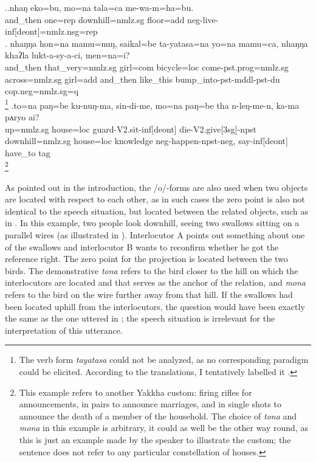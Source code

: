 \ex.\ag.\label{mewamhabu}nhaŋ eko=bu,    mo=na tala=ca         me-wa-m=ha=bu.\\
and\_then one{\sc =rep} downhill{\sc =nmlz.sg} floor{\sc =add} {\sc neg-}live{\sc -inf[deont]=nmlz.nsg=rep} \\
 
\bg. nhaŋŋa hon=na mamu=nuŋ, saikal=be ta-yatasa=na yo=na mamu=ca, nhaŋŋa khaʔla lukt-a-sy-a-ci,  men=na=i?\\
	and\_then that\_very{\sc =nmlz.sg} girl{\sc =com} bicycle{\sc =loc} come{\sc [3sg]-pst.prog=nmlz.sg} across{\sc =nmlz.sg} girl{\sc =add} and\_then like\_this bump\_into{\sc -pst-mddl-pst-du} {\sc cop.neg=nmlz.sg=q}\\
\footnote{The verb form \emph{tayatasa} could not be analyzed, as no corresponding paradigm could be elicited. According to the  translations, I tentatively labelled it .} 
\bg.to=na  paŋ=be     ku-nuŋ-ma, sin-di-me,  mo=na  paŋ=be     tha  n-leŋ-me-n, ka-ma pʌryo  ai?\\
up{\sc =nmlz.sg} house{\sc =loc} guard{\sc -V2.sit-inf[deont]} die{\sc -V2.give[3sg]-npst} downhill{\sc =nmlz.sg} house{\sc =loc} knowledge {\sc neg-}happen{\sc [3sg]-npst-neg}, say{\sc -inf[deont]} have\_to {\sc tag}\\
\footnote{This example refers to another Yakkha custom: firing rifles for announcements, in pairs to announce marriages, and in single shots to announce the death of a  member of the household. The choice of \emph{tona} and \emph{mona} in this example is arbitrary, it could as well be the other way round, as this is just an example made by the speaker to illustrate the custom; the sentence does not refer to any particular constellation of houses.} 	 
   			
			
As pointed out in the introduction, the /o/-forms are also used when two objects are located with respect to each other, as in such cases the zero point is also not identical to the speech situation, but located between the related objects, such as in \Next. In this example, two people look downhill, seeing two swallows  sitting on a parallel wires (as illustrated in ). Interlocutor A points out something about one of the  swallows and interlocutor B wants to reconfirm whether he got the reference right. The  zero point for the projection is located between the two birds. The demonstrative \emph{tona} refers to the bird closer to the hill on which the interlocutors are located and that serves as the anchor of the relation, and \emph{mona} refers to the bird on the wire  further away from that hill. If the swallows had been located uphill from the interlocutors, the question would have been exactly the same as the one uttered in \Next; the speech situation is irrelevant for the interpretation of this utterance.


